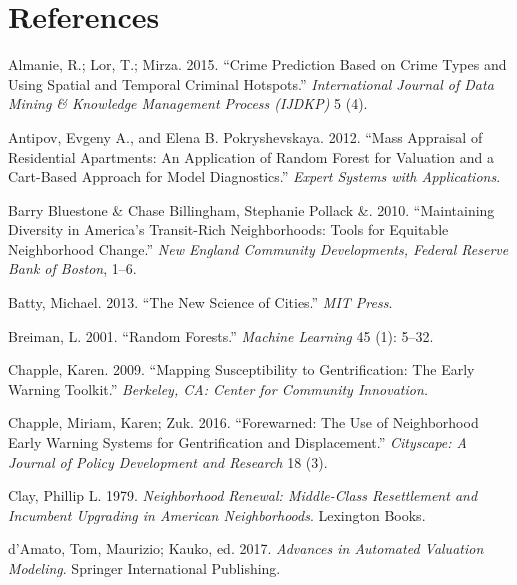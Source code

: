 \documentclass[12pt,]{article}
\begin{document}
\newpage

\hypertarget{references}{%
\section*{References}\label{references}}

\hypertarget{refs}{}
\leavevmode\hypertarget{ref-Almanie2015}{}%
Almanie, R.; Lor, T.; Mirza. 2015. ``Crime Prediction Based on Crime
Types and Using Spatial and Temporal Criminal Hotspots.''
\emph{International Journal of Data Mining \& Knowledge Management
Process (IJDKP)} 5 (4).

\leavevmode\hypertarget{ref-antipov12}{}%
Antipov, Evgeny A., and Elena B. Pokryshevskaya. 2012. ``Mass Appraisal
of Residential Apartments: An Application of Random Forest for Valuation
and a Cart-Based Approach for Model Diagnostics.'' \emph{Expert Systems
with Applications}.

\leavevmode\hypertarget{ref-Pollack2010}{}%
Barry Bluestone \& Chase Billingham, Stephanie Pollack \&. 2010.
``Maintaining Diversity in America's Transit-Rich Neighborhoods: Tools
for Equitable Neighborhood Change.'' \emph{New England Community
Developments, Federal Reserve Bank of Boston}, 1--6.

\leavevmode\hypertarget{ref-Batty2013}{}%
Batty, Michael. 2013. ``The New Science of Cities.'' \emph{MIT Press}.

\leavevmode\hypertarget{ref-Breiman2001}{}%
Breiman, L. 2001. ``Random Forests.'' \emph{Machine Learning} 45 (1):
5--32.

\leavevmode\hypertarget{ref-Chapple2009}{}%
Chapple, Karen. 2009. ``Mapping Susceptibility to Gentrification: The
Early Warning Toolkit.'' \emph{Berkeley, CA: Center for Community
Innovation.}

\leavevmode\hypertarget{ref-Chapple2016}{}%
Chapple, Miriam, Karen; Zuk. 2016. ``Forewarned: The Use of Neighborhood
Early Warning Systems for Gentrification and Displacement.''
\emph{Cityscape: A Journal of Policy Development and Research} 18 (3).

\leavevmode\hypertarget{ref-Clay1979}{}%
Clay, Phillip L. 1979. \emph{Neighborhood Renewal: Middle-Class
Resettlement and Incumbent Upgrading in American Neighborhoods}.
Lexington Books.

\leavevmode\hypertarget{ref-Springer2017}{}%
d'Amato, Tom, Maurizio; Kauko, ed. 2017. \emph{Advances in Automated
Valuation Modeling}. Springer International Publishing.
\end{document}
